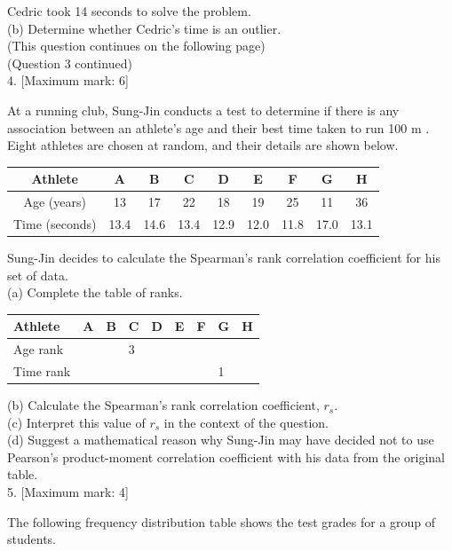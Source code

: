 \documentclass[10pt]{article}
\begin{document}
Cedric took 14 seconds to solve the problem.\\
(b) Determine whether Cedric's time is an outlier.\\
(This question continues on the following page)\\
(Question 3 continued)\\[0pt]
4. [Maximum mark: 6]

At a running club, Sung-Jin conducts a test to determine if there is any association between an athlete's age and their best time taken to run 100 m . Eight athletes are chosen at random, and their details are shown below.

\begin{center}
\begin{tabular}{|c|c|c|c|c|c|c|c|c|}
\hline
Athlete & A & B & C & D & E & F & G & H \\
\hline
Age (years) & 13 & 17 & 22 & 18 & 19 & 25 & 11 & 36 \\
\hline
Time (seconds) & 13.4 & 14.6 & 13.4 & 12.9 & 12.0 & 11.8 & 17.0 & 13.1 \\
\hline
\end{tabular}
\end{center}

Sung-Jin decides to calculate the Spearman's rank correlation coefficient for his set of data.\\
(a) Complete the table of ranks.

\begin{center}
\begin{tabular}{|l|l|l|l|l|l|l|l|l|}
\hline
Athlete & A & B & C & D & E & F & G & H \\
\hline
Age rank &  &  & 3 &  &  &  &  &  \\
\hline
Time rank &  &  &  &  &  &  & 1 &  \\
\hline
\end{tabular}
\end{center}

(b) Calculate the Spearman's rank correlation coefficient, $r_{s}$.\\
(c) Interpret this value of $r_{s}$ in the context of the question.\\
(d) Suggest a mathematical reason why Sung-Jin may have decided not to use Pearson's product-moment correlation coefficient with his data from the original table.\\[0pt]
5. [Maximum mark: 4]

The following frequency distribution table shows the test grades for a group of students.
\end{document}
